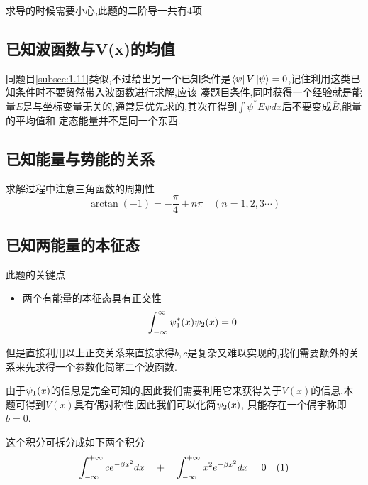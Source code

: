 \documentclass{article}
\begin{document}
        求导的时候需要小心,此题的二阶导一共有4项
    
    \subsection{已知波函数与\texorpdfstring{V(x)}{}的均值}
        同题目\ref{subsec:1.11}类似,不过给出另一个已知条件是$\bra{\psi}V\ket{\psi}=0$,记住利用这类已知条件时不要贸然带入波函数进行求解,应该
        凑题目条件,同时获得一个经验就是能量$E$是与坐标变量无关的,通常是优先求的,其次在得到$\int \psi^{*}E\psi dx$后不要变成$\bar{E}$,能量的平均值和
        定态能量并不是同一个东西.

    \subsection{已知能量与势能的关系}
        求解过程中注意三角函数的周期性  
        $$  \arctan{(-1)}=-\frac{\pi}{4}+n\pi \quad (n=1,2,3 \cdots ) $$    
    
    \subsection{已知两能量的本征态}
        此题的关键点
        \begin{itemize}
            \item 两个有能量的本征态具有正交性
                  $$ \int_{-\infty}^{\infty} \psi_{1}^{*} (x) \psi_{2} (x)  = 0 $$
        \end{itemize}

        但是直接利用以上正交关系来直接求得$b,c$是复杂又难以实现的,我们需要额外的关系来先求得一个参数化简第二个波函数. 

        由于$\psi_{1} (x)$的信息是完全可知的,因此我们需要利用它来获得关于$V(x)$的信息,本题可得到$V(x)$具有偶对称性,因此我们可以化简$\psi_{2} (x)$,
        只能存在一个偶宇称即$b=0$.

        这个积分可拆分成如下两个积分
            $$ \int_{-\infty}^{+\infty} c e^{-\beta x^{2}} dx  \quad + \quad   \int_{-\infty}^{+\infty} x^{2} e^{-\beta x^{2}} dx=0 \quad (1)$$   
        
\end{document}
